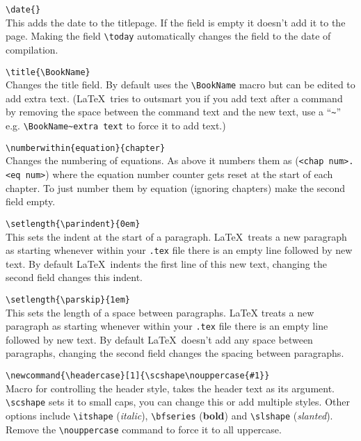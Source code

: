 \documentclass[Book Template.tex]{subfiles}
\begin{document}
                \verb+\date{}+\\
                This adds the date to the titlepage. If the field is empty it doesn't add it to the page. Making the field \verb+\today+ automatically changes the field to the date of compilation.

                \verb+\title{\BookName}+\\
                Changes the title field. By default uses the \verb+\BookName+ macro but can be edited to add extra text. (\LaTeX~tries to outsmart you if you add text after a command by removing the space between the command text and the new text, use a ``\verb+~+'' e.g. \verb+\BookName~extra text+ to force it to add text.)

                \verb+\numberwithin{equation}{chapter}+\\
                Changes the numbering of equations. As above it numbers them as (\verb+<chap num>.<eq num>+) where the equation number counter gets reset at the start of each chapter. To just number them by equation (ignoring chapters) make the second field empty.

                \newpage

                \verb+\setlength{\parindent}{0em}+\\
                This sets the indent at the start of a paragraph. \LaTeX~treats a new paragraph as starting whenever within your \verb+.tex+ file there is an empty line followed by new text. By default \LaTeX~indents the first line of this new text, changing the second field changes this indent.

                \verb+\setlength{\parskip}{1em}+\\
                This sets the length of a space between paragraphs. LaTeX treats a new paragraph as starting whenever within your \verb+.tex+ file there is an empty line followed by new text. By default \LaTeX~doesn't add any space between paragraphs, changing the second field changes the spacing between paragraphs.

                \verb+\newcommand{\headercase}[1]{\scshape\nouppercase{#1}}+\\
                Macro for controlling the header style, takes the header text as its argument. \verb+\scshape+ sets it to small caps, you can change this or add multiple styles. Other options include \verb+\itshape+ ({\itshape italic}), \verb+\bfseries+ ({\bfseries bold}) and \verb+\slshape+ ({\slshape slanted}).\\
                Remove the \verb+\nouppercase+ command to force it to all uppercase.
\end{document}
